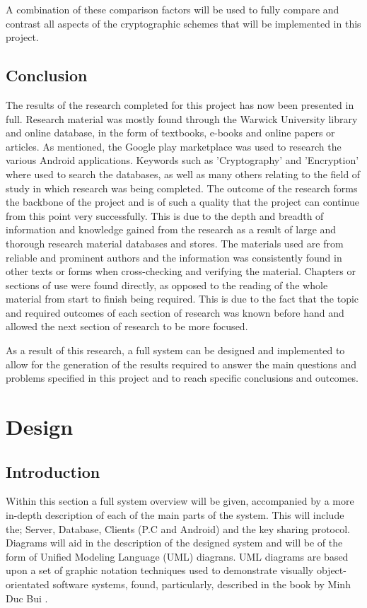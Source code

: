 \documentclass[a4paper,12pt]{report}
\begin{document}
A combination of these comparison factors will be used to fully compare and contrast all aspects of the cryptographic schemes that will be implemented in this project. 

\section{Conclusion}

The results of the research completed for this project has now been presented in full. Research material was mostly found through the Warwick University library and online database, in the form of textbooks, e-books and online papers or articles. As mentioned, the Google play marketplace was used to research the various Android applications. Keywords such as 'Cryptography' and 'Encryption' where used to search the databases, as well as many others relating to the field of study in which research was being completed. The outcome of the research forms the backbone of the project and is of such a quality that the project can continue from this point very successfully. This is due to the depth and breadth of information and knowledge gained from the research as a result of large and thorough research material databases and stores. The materials used are from reliable and prominent authors and the information was consistently found in other texts or forms when cross-checking and verifying the material. Chapters or sections of use were found directly, as opposed to the reading of the whole material from start to finish being required. This is due to the fact that the topic and required outcomes of each section of research was known before hand and allowed the next section of research to be more focused.

As a result of this research, a full system can be designed and implemented to allow for the generation of the results required to answer the main questions and problems specified in this project and to reach specific conclusions and outcomes.  

\chapter{Design}

\section{Introduction}

Within this section a full system overview will be given, accompanied by a more in-depth description of each of the main parts of the system. This will include the; Server, Database, Clients (P.C and Android) and the key sharing protocol. Diagrams will aid in the description of the designed system and will be of the form of Unified Modeling Language (UML) diagrans. UML diagrams are based upon a set of graphic notation techniques used to demonstrate visually object-orientated software systems, found, particularly, described in the book by Minh Duc Bui \cite{umlbook}.
\end{document}
